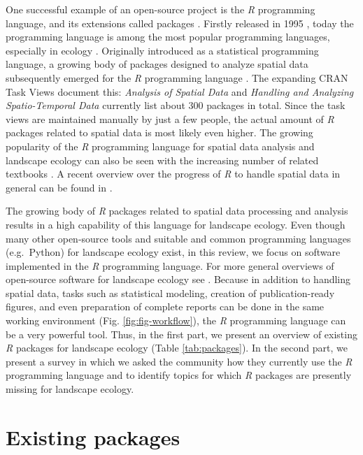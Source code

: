 \documentclass[smallextended]{svjour3}       %
\begin{document}
One successful example of an open-source project is the \emph{R} programming language, and its extensions called packages \cite{RCoreTeam2019}.
Firstly released in 1995 \cite{Smith2016}, today the programming language is among the most popular programming languages, especially in ecology \cite{Lai2019}.
Originally introduced as a statistical programming language, a growing body of packages designed to analyze spatial data subsequently emerged for the \emph{R} programming language \cite{Bivand2006,Lovelace2019}.
The expanding CRAN Task Views document this: \emph{Analysis of Spatial Data} \cite{Bivand2019a} and \emph{Handling and Analyzing Spatio-Temporal Data} \cite{Pebesma2020} currently list about 300 packages in total.
Since the task views are maintained manually by just a few people, the actual amount of \emph{R} packages related to spatial data is most likely even higher.
The growing popularity of the \emph{R} programming language for spatial data analysis and landscape ecology can also be seen with the increasing number of related textbooks \cite{Wegmann2016,Fletcher2019,Lovelace2019,Pebesma2019a}.
A recent overview over the progress of \emph{R} to handle spatial data in general can be found in \cite{Bivand2020}.

The growing body of \emph{R} packages related to spatial data processing and analysis results in a high capability of this language for landscape ecology.
Even though many other open-source tools \cite{QGISDevelopmentTeam2016,GRASSDevelopmentTeam2017,Porta2017} and suitable and common programming languages (e.g.~Python) for landscape ecology exist, in this review, we focus on software implemented in the \emph{R} programming language.
For more general overviews of open-source software for landscape ecology see \cite{Jolma2008,Steiniger2009,Steiniger2009a,Istvan2012}.
Because in addition to handling spatial data, tasks such as statistical modeling, creation of publication-ready figures, and even preparation of complete reports can be done in the same working environment (Fig. \ref{fig:fig-workflow}), the \emph{R} programming language can be a very powerful tool.
Thus, in the first part, we present an overview of existing \emph{R} packages for landscape ecology (Table \ref{tab:packages}).
In the second part, we present a survey in which we asked the community how they currently use the \emph{R} programming language and to identify topics for which \emph{R} packages are presently missing for landscape ecology.

\hypertarget{sec:existing_packages}{%
\section{Existing packages}\label{sec:existing_packages}}
\end{document}
